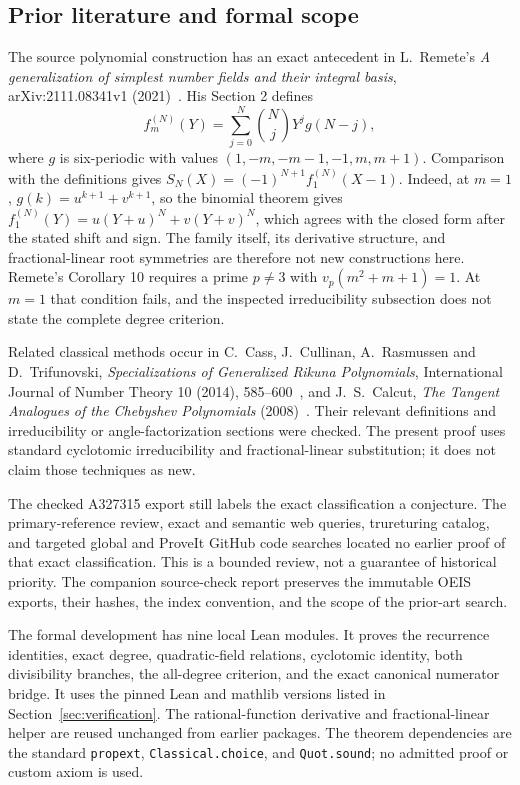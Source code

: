 \documentclass[11pt]{article}
\begin{document}
\subsection{Prior literature and formal scope}

The source polynomial construction has an exact antecedent in
L.~Remete's \emph{A generalization of simplest number fields and their
integral basis}, arXiv:2111.08341v1 (2021)~\cite{Remete}.  His Section 2 defines
\[
 f_m^{(N)}(Y)=\sum_{j=0}^N\binom NjY^j g(N-j),
\]
where $g$ is six-periodic with values
$(1,-m,-m-1,-1,m,m+1)$.  Comparison with the definitions gives
$S_N(X)=(-1)^{N+1}f_1^{(N)}(X-1)$.
Indeed, at $m=1$, $g(k)=u^{k+1}+v^{k+1}$, so the binomial theorem gives
$f_1^{(N)}(Y)=u(Y+u)^N+v(Y+v)^N$, which agrees with the closed form
after the stated shift and sign.
The family itself, its derivative structure, and fractional-linear
root symmetries are therefore not new constructions here.
Remete's Corollary 10 requires a prime $p\ne3$ with
$v_p(m^2+m+1)=1$.  At $m=1$ that condition fails, and the inspected
irreducibility subsection does not state the complete degree criterion.

Related classical methods occur in C.~Cass, J.~Cullinan,
A.~Rasmussen and D.~Trifunovski, \emph{Specializations of Generalized
Rikuna Polynomials}, International Journal of Number Theory 10 (2014),
585--600~\cite{Rikuna}, and J.~S.~Calcut, \emph{The Tangent Analogues of the Chebyshev
Polynomials} (2008)~\cite{Calcut}.  Their relevant definitions and irreducibility or
angle-factorization sections were checked.  The present proof uses
standard cyclotomic irreducibility and fractional-linear substitution;
it does not claim those techniques as new.

The checked A327315 export still labels the exact classification a
conjecture.  The primary-reference review, exact and semantic web
queries, trureturing catalog, and targeted global and ProveIt GitHub
code searches located no earlier proof of that exact classification.
This is a bounded review, not a guarantee of historical priority.
The companion source-check report preserves the immutable OEIS exports,
their hashes, the index convention, and the scope of the prior-art search.

The formal development has nine local Lean modules.  It proves the
recurrence identities, exact degree, quadratic-field relations,
cyclotomic identity, both divisibility branches, the all-degree
criterion, and the exact canonical numerator bridge.  It uses the pinned Lean and mathlib versions
listed in Section~\ref{sec:verification}.
The rational-function derivative and fractional-linear helper are
reused unchanged from earlier packages.  The theorem dependencies are
the standard \texttt{propext}, \texttt{Classical.choice}, and
\texttt{Quot.sound}; no admitted proof or custom axiom is used.
\end{document}
